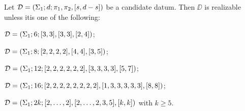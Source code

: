 \begin{theorem} \label{short-partition:th:realizability-on-torus-n-3}
Let $\mathcal{D}=(\Sigma_{1};d;\pi_1,\pi_2,[s,d-s])$ be a candidate datum. Then $\DD$ is realizable unless itis one of the following:
\begin{enumarabic}
\item $\mathcal{D}=(\Sigma_{1};6;[3,3],[3,3],[2,4])$;
\item $\mathcal{D}=(\Sigma_{1};8;[2,2,2,2],[4,4],[3,5])$;
\item $\mathcal{D}=(\Sigma_{1};12;[2,2,2,2,2,2],[3,3,3,3],[5,7])$;
\item $\mathcal{D}=(\Sigma_{1};16;[2,2,2,2,2,2,2,2],[1,3,3,3,3,3],[8,8])$;
\item $\mathcal{D}=(\Sigma_{1};2k;[2,\ldots,2],[2,\ldots,2,3,5],[k,k])$ with $k\ge 5$.
\end{enumarabic}
\end{theorem}

